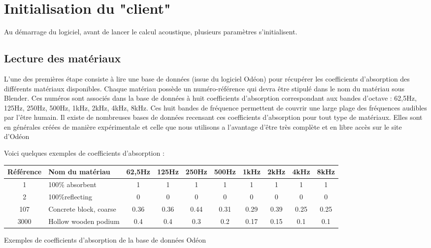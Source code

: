 \section{Initialisation du "client"}
Au démarrage du logiciel, avant de lancer le calcul acoustique, plusieurs paramètres s'initialisent.

\subsection{Lecture des matériaux} \label{sect_lectMat}
L'une des premières étape consiste à lire une base de données (issue du logiciel Odéon) pour récupérer les coefficients d'absorption des différents matériaux disponibles. Chaque matériau possède un numéro-référence qui devra être stipulé dans le nom du matériau sous Blender. Ces numéros sont associés dans la base de données à huit coefficients d'absorption correspondant aux bandes d'octave : 62,5Hz, 125Hz, 250Hz, 500Hz, 1kHz, 2kHz, 4kHz, 8kHz. Ces huit bandes de fréquence permettent de couvrir une large plage des fréquences audibles par l'être humain. Il existe de nombreuses bases de données recensant ces coefficients d'absorption pour tout type de matériaux. Elles sont en générales créées de manière expérimentale et celle que nous utilisons a l'avantage d'être très complète et en libre accès sur le site d'Odéon \cite[Materials]{odeon}

Voici quelques exemples de coefficients d'absorption :
\begin{tableth}
\footnotesize
	\begin{tabular}{| c | m{2.5cm} | *{8}{c|}}
		\hline
		Référence & Nom du matériau & 62,5Hz & 125Hz & 250Hz & 500Hz & 1kHz & 2kHz & 4kHz & 8kHz \\
		  \hline
		  \hline
		   1 & 100\% absorbent & 1 & 1 & 1 & 1 & 1 & 1 & 1 & 1 \\
		   \hline
		2 & 100\%reflecting & 0 & 0 & 0 & 0 & 0 & 0 & 0 & 0 \\
		   \hline
		107 & Concrete block, coarse\footnotemark & 0.36 & 0.36 & 0.44 & 0.31 & 0.29 & 0.39 & 0.25 & 0.25 \\
		   \hline
		3000 & Hollow wooden podium\footnotemark & 0.4 & 0.4 & 0.3 & 0.2 & 0.17 & 0.15 & 0.1 & 0.1 \\
	     \hline
	 \end{tabular}
	\caption{Exemples de coefficients d'absorption de la base de données Odéon}
	\label{exempleOdeon}
\end{tableth}
\addtocounter{footnote}{-1}
\addtocounter{footnote}{1}


